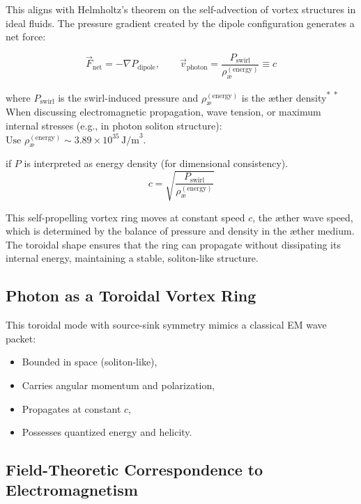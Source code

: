This aligns with Helmholtz's theorem on the self-advection of vortex structures in ideal fluids. The pressure gradient created by the dipole configuration generates a net force:

\begin{equation}
    \vec{F}_\text{net} = -\nabla P_{\text{dipole}}, \qquad \vec{v}_\text{photon} = \frac{P_{\text{swirl}}}{\rho_\text{\ae}^{(\text{energy})}} \equiv c
\end{equation}

\noindent
where $P_{\text{swirl}}$ is the swirl-induced pressure and $\rho_\text{\ae}^{(\text{energy})}$ is the æther density\textsuperscript{*}
\vspace{0.5em}
\noindent\textsuperscript{*}\small
When discussing electromagnetic propagation, wave tension, or maximum internal stresses (e.g., in photon soliton structure): $\text{Use } \rho_\text{\ae}^{(\text{energy})} \sim 3.89 \times 10^{35} \, \text{J/m}^3$.


if $P$ is interpreted as energy density (for dimensional consistency).
\begin{equation}
    c = \sqrt{\frac{P_{\text{swirl}}}{\rho_\text{\ae}^{(\text{energy})}}}
\end{equation}

This self-propelling vortex ring moves at constant speed $c$, the æther wave speed, which is determined by the balance of pressure and density in the æther medium. The toroidal shape ensures that the ring can propagate without dissipating its internal energy, maintaining a stable, soliton-like structure.

\subsection{Photon as a Toroidal Vortex Ring}
This toroidal mode with source-sink symmetry mimics a classical EM wave packet:
\begin{itemize}
    \item Bounded in space (soliton-like),
    \item Carries angular momentum and polarization,
    \item Propagates at constant \( c \),
    \item Possesses quantized energy and helicity.
\end{itemize}


\subsection{Field-Theoretic Correspondence to Electromagnetism}

